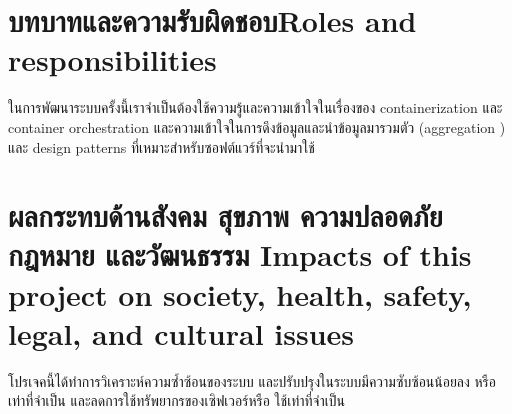 \section{\ifcpe บทบาทและความรับผิดชอบ\else Roles and responsibilities\fi}
ในการพัฒนาระบบครั้งนี้เราจำเป็นต้องใช้ความรู้และความเข้าใจในเรื่องของ containerization \cite{containerization} และ container orchestration \cite{orchestration} และความเข้าใจในการดึงข้อมูลและนำข้อมูลมารวมตัว (aggregation \cite{aggregation}) และ design patterns ที่เหมาะสำหรับซอฟต์แวร์ที่จะนำมาใช้

\section{\ifcpe%
ผลกระทบด้านสังคม สุขภาพ ความปลอดภัย กฎหมาย และวัฒนธรรม
\else%
Impacts of this project on society, health, safety, legal, and cultural issues
\fi}

โปรเจคนี้ได้ทำการวิเคราะห์ความซ้ำซ้อนของระบบ และปรับปรุงในระบบมีความซับซ้อนน้อยลง หรือเท่าที่จำเป็น และลดการใช้ทรัพยากรของเซิฟเวอร์หรือ ใช้เท่าที่จำเป็น